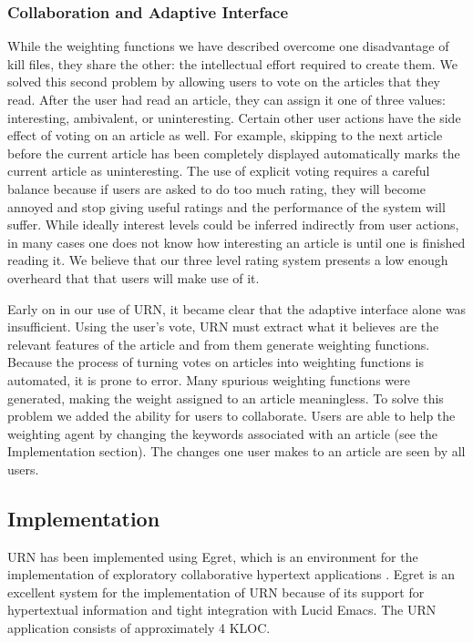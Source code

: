 \subsubsection{Collaboration and Adaptive Interface}

While the weighting functions we have described overcome one disadvantage of
kill files, they share the other: the intellectual effort required to create
them. We solved this second problem by allowing users to vote on the articles
that they read. After the user had read an article, they can assign it one of
three values: interesting, ambivalent, or uninteresting. Certain other user
actions have the side effect of voting on an article as well. For example,
skipping to the next article before the current article has been completely
displayed automatically marks the current article as uninteresting. The use of
explicit voting requires a careful balance because if users are asked to do too
much rating, they will become annoyed and stop giving useful ratings and the
performance of the system will suffer. While ideally interest levels could be
inferred indirectly from user actions, in many cases one does not know how
interesting an article is until one is finished reading it. We believe that our
three level rating system presents a low enough overheard that that users will
make use of it.

Early on in our use of URN, it became clear that the adaptive interface alone
was insufficient. Using the user's vote, URN must extract what it believes are
the relevant features of the article and from them generate weighting
functions. Because the process of turning votes on articles into weighting
functions is automated, it is prone to error. Many spurious weighting functions
were generated, making the weight assigned to an article meaningless. To solve
this problem we added the ability for users to collaborate. Users are able to
help the weighting agent by changing the keywords associated with an article
(see the Implementation section). The changes one user makes to an article are
seen by all users.

\subsection{Implementation}

URN has been implemented using Egret, which is an environment for the
implementation of exploratory collaborative hypertext applications
\cite{csdl-91-03,csdl-92-01}. Egret is an excellent system for the
implementation of URN because of its support for hypertextual information and
tight integration with Lucid Emacs. The URN application consists of
approximately 4 KLOC.

